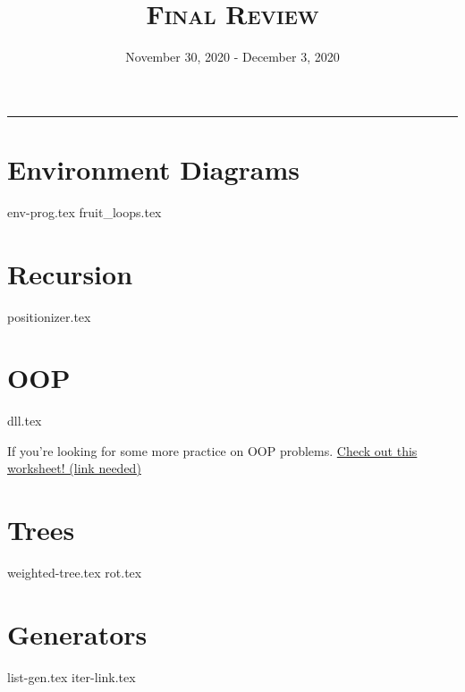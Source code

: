 \documentclass{exam}
\title{\textsc{Final Review}}
\date{November 30, 2020 - December 3, 2020}
\begin{document}
\maketitle\rule{\textwidth}{0.15em}
\fontsize{12}{15}\selectfont

\section{Environment Diagrams}
\begin{questions}
{env-prog.tex}
{fruit_loops.tex}
\end{questions}
\newpage

\section{Recursion}
\begin{questions}
{positionizer.tex}
\end{questions}
\newpage

\section{OOP}
\begin{questions}
{dll.tex}
\end{questions}
\vspace{1\baselineskip}
If you're looking for some more practice on OOP problems. \href{INSERT OOP LINK HERE}{Check out this worksheet! (link needed)}
\newpage

\section{Trees}
\begin{questions}
{weighted-tree.tex}
{rot.tex}
\end{questions}

\section{Generators}
\begin{questions}
{list-gen.tex}
{iter-link.tex}
\end{questions}
\end{document}
